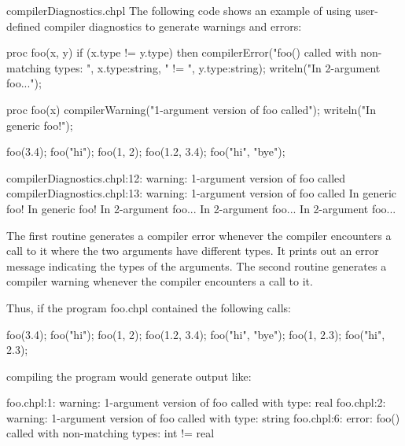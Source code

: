 \begin{chapelexample}{compilerDiagnostics.chpl}
The following code shows an example of using user-defined compiler
diagnostics to generate warnings and errors:
\begin{chapel}
proc foo(x, y) {
  if (x.type != y.type) then
    compilerError("foo() called with non-matching types: ", 
                  x.type:string, " != ", y.type:string);
  writeln("In 2-argument foo...");
}

proc foo(x) {
  compilerWarning("1-argument version of foo called");
  writeln("In generic foo!");
}
\end{chapel}
\begin{chapelpost}
foo(3.4);
foo("hi");
foo(1, 2);
foo(1.2, 3.4);
foo("hi", "bye");
\end{chapelpost}
\begin{chapeloutput}
compilerDiagnostics.chpl:12: warning: 1-argument version of foo called
compilerDiagnostics.chpl:13: warning: 1-argument version of foo called
In generic foo!
In generic foo!
In 2-argument foo...
In 2-argument foo...
In 2-argument foo...
\end{chapeloutput}

The first routine generates a compiler error whenever the compiler
encounters a call to it where the two arguments have different types.
It prints out an error message indicating the types of the arguments.
The second routine generates a compiler warning whenever the compiler
encounters a call to it.

Thus, if the program foo.chpl contained the following calls:

\begin{numberedchapel}
foo(3.4);
foo("hi");
foo(1, 2);
foo(1.2, 3.4);
foo("hi", "bye");
foo(1, 2.3);
foo("hi", 2.3);
\end{numberedchapel}

\noindent compiling the program would generate output like:

\begin{commandline}
foo.chpl:1: warning: 1-argument version of foo called with type: real
foo.chpl:2: warning: 1-argument version of foo called with type: string
foo.chpl:6: error: foo() called with non-matching types: int != real
\end{commandline}

\end{chapelexample}

